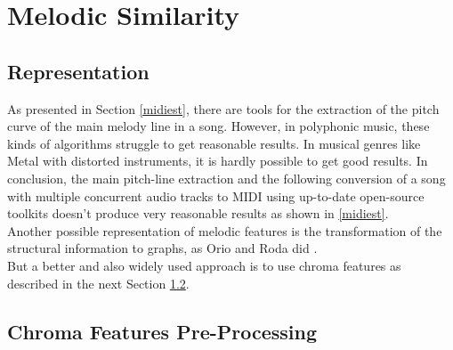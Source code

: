 \newpage

\section{Melodic Similarity}\label{melsimc}

\subsection{Representation}

As presented in Section \ref{midiest}, there are tools for the extraction of the pitch curve of the main melody line in a song. However, in polyphonic music, these kinds of algorithms struggle to get reasonable results. %
In musical genres like Metal with distorted instruments, it is hardly possible to get good results. 
In conclusion, the main pitch-line extraction and the following conversion of a song with multiple concurrent audio tracks to MIDI using up-to-date open-source toolkits doesn't produce very reasonable results as shown in \ref{midiest}.\\
Another possible representation of melodic features is the transformation of the structural information to graphs, as Orio and Roda did \cite{graph1}.\\ 
But a better and also widely used approach is to use chroma features as described in the next Section \ref{chromafeat}.

\subsection{Chroma Features Pre-Processing}\label{chromafeat}

